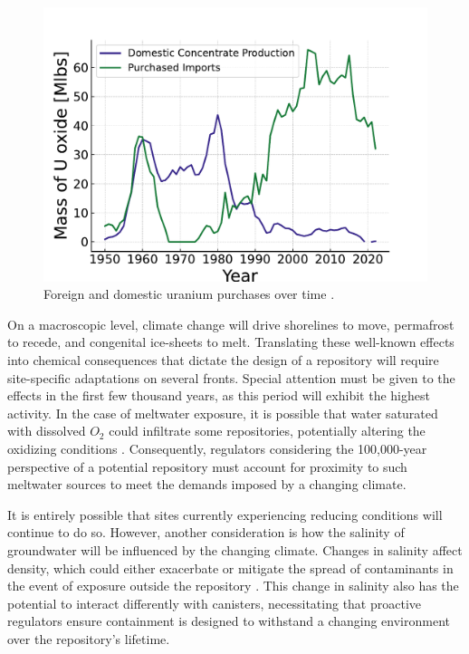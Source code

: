 \begin{figure}[!h]
   \centering
   \includegraphics[scale=0.8]{images/intro/uranium_production_imports.pdf}
   \caption{Foreign and domestic uranium purchases over time \cite{eia_monthly_energy_review_2024}.}
   \label{fig:foregin_u3o8}
\end{figure}








On a macroscopic level, climate change will drive shorelines to move, permafrost to recede, and congenital ice-sheets to melt. Translating these well-known effects into chemical consequences that dictate the design of a repository will require site-specific adaptations on several fronts. Special attention must be given to the effects in the first few thousand years, as this period will exhibit the highest activity. In the case of meltwater exposure, it is possible that water saturated with dissolved $O_2$ could infiltrate some repositories, potentially altering the oxidizing conditions \cite{gurban_hydrochemical_2001}. Consequently, regulators considering the 100,000-year perspective of a potential repository must account for proximity to such meltwater sources to meet the demands imposed by a changing climate.

It is entirely possible that sites currently experiencing reducing conditions will continue to do so. However, another consideration is how the salinity of groundwater will be influenced by the changing climate. Changes in salinity affect density, which could either exacerbate or mitigate the spread of contaminants in the event of exposure outside the repository \cite{gurban_hydrochemical_2001}. This change in salinity also has the potential to interact differently with canisters, necessitating that proactive regulators ensure containment is designed to withstand a changing environment over the repository's lifetime.

